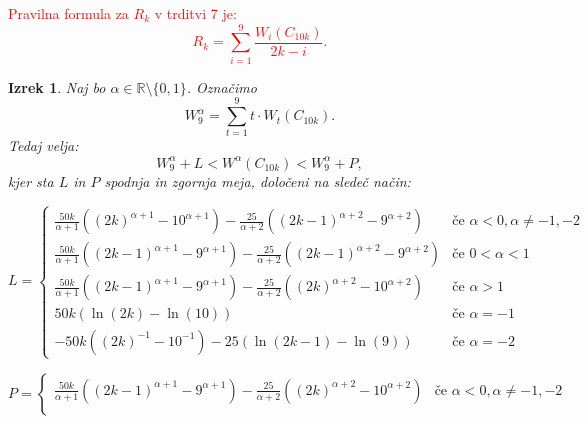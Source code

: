 \documentclass[a4paper, 12pt]{article}
\newtheorem{izrek}{Izrek}[section]
\begin{document}
\textcolor{red}{
Pravilna formula za $R_k$ v trditvi 7 je:
\begin{equation*}
    R_k = \sum_{i=1}^{9} \frac{W_i(C_{10k})}{2k - i}.
\end{equation*}
}
\begin{izrek}
    Naj bo $\alpha \in \mathbb{R} \setminus \{0,1\}$. Označimo
    \begin{equation*}
        W_9^\alpha = \sum_{t=1}^{9} t \cdot W_t(C_{10k}).
    \end{equation*}
    Tedaj velja:
    \begin{equation*}
        W_9^\alpha + L < W^\alpha(C_{10k}) < W_9^\alpha + P,
    \end{equation*}
    kjer sta $L$ in $P$ spodnja in zgornja meja, določeni na sledeč način:


    \begin{equation*}
        L =
        \begin{cases} 
            \frac{50k}{\alpha + 1} \left( (2k)^{\alpha + 1} - 10^{\alpha + 1} \right) - 
            \frac{25}{\alpha + 2} \left( (2k-1)^{\alpha + 2} - 9^{\alpha + 2} \right) & \text{če } \alpha < 0, \alpha \neq -1, -2 \\
    
            \frac{50k}{\alpha + 1} \left( (2k-1)^{\alpha + 1} - 9^{\alpha + 1} \right) - 
            \frac{25}{\alpha + 2} \left( (2k-1)^{\alpha + 2} - 9^{\alpha + 2} \right) & \text{če } 0 < \alpha < 1 \\
    
            \frac{50k}{\alpha + 1} \left( (2k-1)^{\alpha + 1} - 9^{\alpha + 1} \right) - 
            \frac{25}{\alpha + 2} \left( (2k)^{\alpha + 2} - 10^{\alpha + 2} \right) & \text{če } \alpha > 1 \\
    
            50k \left( \ln(2k) - \ln(10) \right) & \text{če } \alpha = -1 \\
    
            -50k \left( (2k)^{-1} - 10^{-1} \right) - 25 \left( \ln(2k-1) - \ln(9) \right) & \text{če } \alpha = -2
        \end{cases}
    \end{equation*}
    

    \begin{equation*}
        P =
        \begin{cases} 
            \frac{50k}{\alpha + 1} \left( (2k-1)^{\alpha + 1} - 9^{\alpha + 1} \right) - 
            \frac{25}{\alpha + 2} \left( (2k)^{\alpha + 2} - 10^{\alpha + 2} \right) & \text{če } \alpha < 0, \alpha \neq -1, -2 \\
    

\end{cases}
\end{equation*}
\end{izrek}
\end{document}
